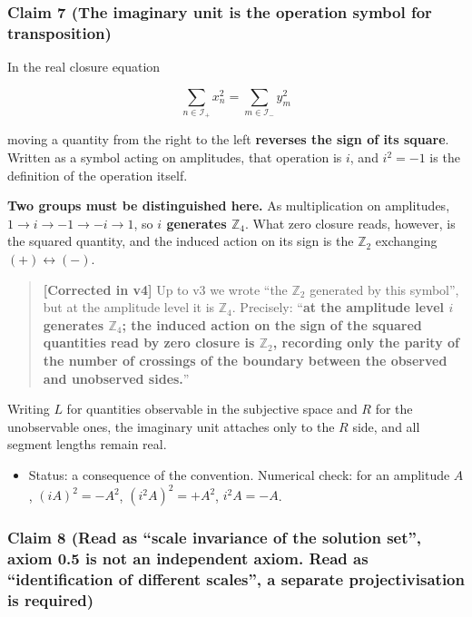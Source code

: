 \documentclass[
  10pt,
]{article}
\providecommand{\tightlist}{%
  \setlength{\itemsep}{0pt}\setlength{\parskip}{0pt}}
\begin{document}
\subsubsection{Claim 7 (The imaginary unit is the operation symbol for
transposition)}\label{claim-7-the-imaginary-unit-is-the-operation-symbol-for-transposition}

In the real closure equation

\[\sum_{n\in\mathcal{I}_+} x_n^2 = \sum_{m\in\mathcal{I}_-} y_m^2\]

moving a quantity from the right to the left \textbf{reverses the sign
of its square}. Written as a symbol acting on amplitudes, that operation
is \(i\), and \(i^2=-1\) is the definition of the operation itself.

\textbf{Two groups must be distinguished here.} As multiplication on
amplitudes, \(1\to i\to -1\to -i\to 1\), so \textbf{\(i\) generates
\(\mathbb{Z}_4\)}. What zero closure reads, however, is the squared
quantity, and the induced action on its sign is the
\textbf{\(\mathbb{Z}_2\)} exchanging \((+)\leftrightarrow(-)\).

\begin{quote}
\textbf{{[}Corrected in v4{]}} Up to v3 we wrote ``the \(\mathbb{Z}_2\)
generated by this symbol'', but at the amplitude level it is
\(\mathbb{Z}_4\). Precisely: ``\textbf{at the amplitude level \(i\)
generates \(\mathbb{Z}_4\); the induced action on the sign of the
squared quantities read by zero closure is \(\mathbb{Z}_2\), recording
only the parity of the number of crossings of the boundary between the
observed and unobserved sides.}''
\end{quote}

Writing \(L\) for quantities observable in the subjective space and
\(R\) for the unobservable ones, the imaginary unit attaches only to the
\(R\) side, and all segment lengths remain real.

\begin{itemize}
\tightlist
\item
  Status: a consequence of the convention. Numerical check: for an
  amplitude \(A\), \((iA)^2 = -A^2\), \((i^2A)^2 = +A^2\),
  \(i^2A = -A\).
\end{itemize}

\subsubsection{Claim 8 (Read as ``scale invariance of the solution
set'', axiom 0.5 is not an independent axiom. Read as ``identification
of different scales'', a separate projectivisation is
required)}\label{claim-8-read-as-scale-invariance-of-the-solution-set-axiom-0.5-is-not-an-independent-axiom.-read-as-identification-of-different-scales-a-separate-projectivisation-is-required}
\end{document}
